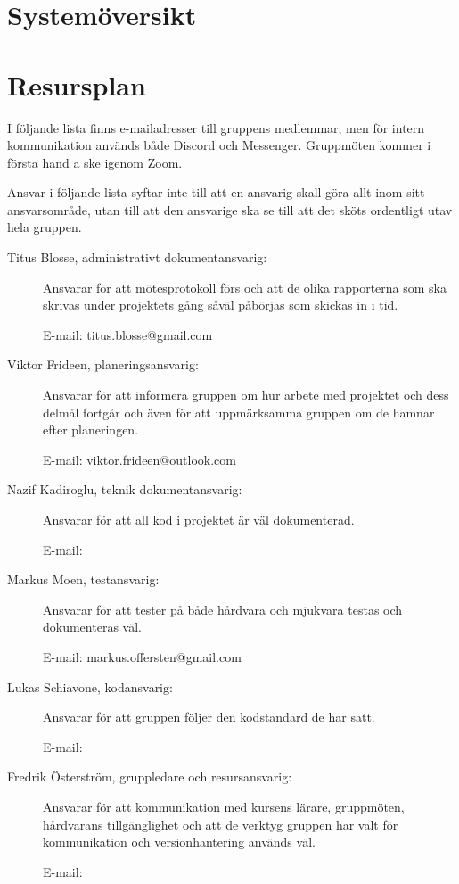 \documentclass{article}
\begin{document}
\section{Systemöversikt}

\section{Resursplan}

I följande lista finns e-mailadresser till gruppens medlemmar, men för intern kommunikation används både Discord och Messenger. Gruppmöten kommer i första hand a ske igenom Zoom.

Ansvar i följande lista syftar inte till att en ansvarig skall göra allt inom sitt ansvarsområde, utan till att den ansvarige ska se till att det sköts ordentligt utav hela gruppen.

\begin{description}
    \item[Titus Blosse, administrativt dokumentansvarig:] Ansvarar för att mötesprotokoll förs och att de olika rapporterna som ska skrivas under projektets gång såväl påbörjas som skickas in i tid.

    E-mail: titus.blosse@gmail.com

    \item[Viktor Frideen, planeringsansvarig:] Ansvarar för att informera gruppen om hur arbete med projektet och dess delmål fortgår och även för att uppmärksamma gruppen om de hamnar efter planeringen.

    E-mail: viktor.frideen@outlook.com

    \item[Nazif Kadiroglu, teknik dokumentansvarig:] Ansvarar för att all kod i projektet är väl dokumenterad.

    E-mail:

    \item[Markus Moen, testansvarig:] Ansvarar för att tester på både hårdvara och mjukvara testas och dokumenteras väl.

    E-mail: markus.offersten@gmail.com

    \item[Lukas Schiavone, kodansvarig:] Ansvarar för att gruppen följer den kodstandard de har satt.

    E-mail:

    \item[Fredrik Österström, gruppledare och resursansvarig:] Ansvarar för att kommunikation med kursens lärare, gruppmöten, hårdvarans tillgänglighet och att de verktyg gruppen har valt för kommunikation och versionhantering används väl.

    E-mail:
\end{description}
\end{document}
